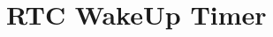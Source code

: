 \hypertarget{group___r_t_c_ex___wake_up___timer}{}\section{R\+TC Wake\+Up Timer}
\label{group___r_t_c_ex___wake_up___timer}
